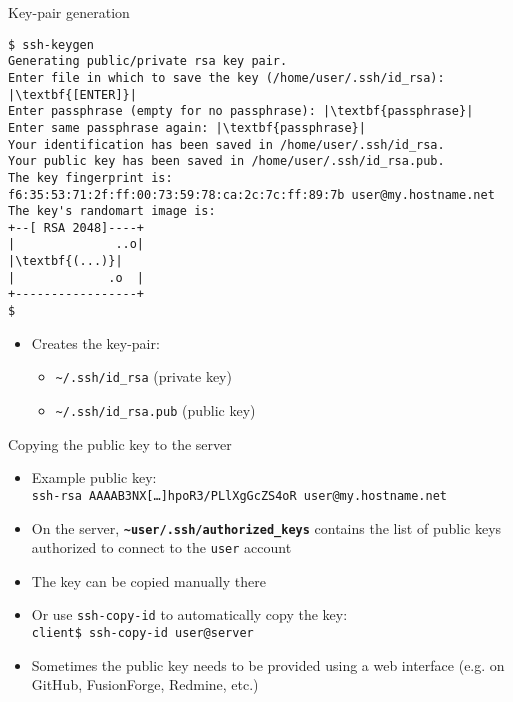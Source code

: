 \documentclass[11pt,final,usepdftitle=false]{beamer}
\newcommand{\tilda}{\textasciitilde{}}
\begin{document}
\begin{frame}[fragile]{Key-pair generation}
\begin{lstlisting}[basicstyle=\ttfamily\scriptsize,escapeinside={||}]
$ ssh-keygen
Generating public/private rsa key pair.
Enter file in which to save the key (/home/user/.ssh/id_rsa): |\textbf{[ENTER]}|
Enter passphrase (empty for no passphrase): |\textbf{passphrase}|
Enter same passphrase again: |\textbf{passphrase}|
Your identification has been saved in /home/user/.ssh/id_rsa.
Your public key has been saved in /home/user/.ssh/id_rsa.pub.
The key fingerprint is:
f6:35:53:71:2f:ff:00:73:59:78:ca:2c:7c:ff:89:7b user@my.hostname.net
The key's randomart image is:
+--[ RSA 2048]----+
|              ..o|
|\textbf{(...)}|
|             .o  |
+-----------------+
$\end{lstlisting}
\begin{itemize}
	\item Creates the key-pair:
		\begin{itemize}
			\item \texttt{\tilda/.ssh/id\_rsa} (private key)
			\item \texttt{\tilda/.ssh/id\_rsa.pub} (public key)
		\end{itemize}
\end{itemize}
\end{frame}

\begin{frame}{Copying the public key to the server}
\begin{itemize}
\item Example public key:\\
	{\footnotesize \texttt{ssh-rsa AAAAB3NX[\ldots]hpoR3/PLlXgGcZS4oR user@my.hostname.net}}
\hbr

\item On the server, \texttt{\bf \tilda{}user/.ssh/authorized\_keys} contains
	the list of public keys authorized to connect to the \texttt{user} account

\hbr
\item The key can be copied manually there
\hbr
\item Or use \texttt{ssh-copy-id} to automatically copy the key:\\
	\texttt{client\$ ssh-copy-id user@server}
\hbr
\item Sometimes the public key needs to be provided using a web interface (e.g. on GitHub, FusionForge, Redmine, etc.)
\end{itemize}
\end{frame}
\end{document}
